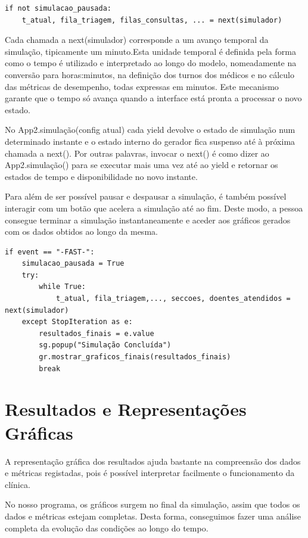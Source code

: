 \documentclass[12pt,a4paper]{article} %
\begin{document}
\begin{verbatim}
if not simulacao_pausada:
    t_atual, fila_triagem, filas_consultas, ... = next(simulador)
\end{verbatim}

    Cada chamada a next(simulador) corresponde a um avanço temporal da simulação, tipicamente um minuto.Esta unidade temporal é definida pela forma como o tempo é utilizado e interpretado ao longo do modelo, nomeadamente na conversão para horas:minutos, na definição dos turnos dos médicos e no cálculo das métricas de desempenho, todas expressas em minutos. Este mecanismo garante que o tempo só avança quando a interface está pronta a processar o novo estado. 

    No App2.simulação(config atual) cada yield devolve o estado de simulação num determinado instante e o estado interno do gerador fica suspenso até à próxima chamada a next(). Por outras palavras, invocar o next() é como dizer ao App2.simulação() para se executar mais uma vez até ao yield e retornar os estados de tempo e disponibilidade no novo instante. 

    \medskip
    Para além de ser possível pausar e despausar a simulação, é também possível interagir com um botão que acelera a simulação até ao fim. Deste modo, a pessoa consegue terminar a simulação instantaneamente e aceder aos gráficos gerados com os dados obtidos ao longo da mesma. 

\begin{verbatim}
if event == "-FAST-":
    simulacao_pausada = True
    try:
        while True:
            t_atual, fila_triagem,..., seccoes, doentes_atendidos = next(simulador)
    except StopIteration as e:
        resultados_finais = e.value
        sg.popup("Simulação Concluída")
        gr.mostrar_graficos_finais(resultados_finais)
        break 
\end{verbatim}
    
    \newpage

    \section{Resultados e Representações Gráficas}

    A representação gráfica dos resultados ajuda bastante na compreensão dos dados e métricas registadas, pois é possível interpretar facilmente o funcionamento da clínica.

    \medskip
    No nosso programa, os gráficos surgem no final da simulação, assim que todos os dados e métricas estejam completas. Desta forma, conseguimos fazer uma análise completa da evolução das condições ao longo do tempo.
\end{document}

